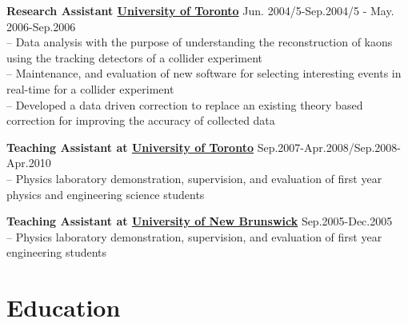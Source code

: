 \documentclass[margin,line]{resume}
\begin{document}
\begin{resume}
\begin{list2}
    \item \textbf{Research Assistant \href{https://www.physics.utoronto.ca/}{University of Toronto}} \hfill{Jun. 2004/5-Sep.2004/5 - May. 2006-Sep.2006}\\
      -- Data analysis with the purpose of understanding the reconstruction of kaons using the tracking detectors of a collider experiment\\
      -- Maintenance, and evaluation of new software for selecting interesting events in real-time for a collider experiment\\
      -- Developed a data driven correction to replace an existing theory based correction for improving the accuracy of collected data 
    \item \textbf{Teaching Assistant at \href{https://www.physics.utoronto.ca/}{University of Toronto}} \hfill{Sep.2007-Apr.2008/Sep.2008-Apr.2010}\\
      -- Physics laboratory demonstration, supervision, and evaluation of first year physics and engineering science students
    \item \textbf{Teaching Assistant at \href{http://www.unb.ca/fredericton/science/depts/physics/}{University of New Brunswick}} \hfill{Sep.2005-Dec.2005}\\
      -- Physics laboratory demonstration, supervision, and evaluation of first year engineering students
    \end{list2}
  
  


    \section{\mysidestyle Education}


\end{resume}
\end{document}

